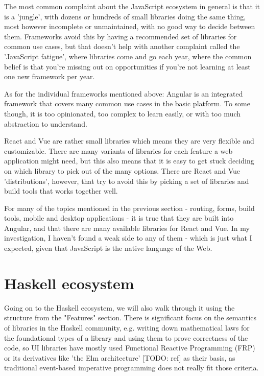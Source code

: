 \documentclass[english,odsaz]{fitthesis}
\begin{document}
The most common complaint about the JavaScript ecosystem in general is that it
is a 'jungle', with dozens or hundreds of small libraries doing the same thing,
most however incomplete or unmaintained, with no good way to decide between
them. Frameworks avoid this by having a recommended set of libraries for common
use cases, but that doesn't help with another complaint called the 'JavaScript
fatigue', where libraries come and go each year, where the common belief is that
you're missing out on opportunities if you're not learning at least one new
framework per year.

As for the individual frameworks mentioned above: Angular is an integrated
framework that covers many common use cases in the basic platform. To some
though, it is too opinionated, too complex to learn easily, or with too much
abstraction to understand.

React and Vue are rather small libraries which means they are very flexible and
customizable. There are many variants of libraries for each feature a web
application might need, but this also means that it is easy to get stuck
deciding on which library to pick out of the many options. There are React and
Vue 'distributions', however, that try to avoid this by picking a set of libraries and
build tools that works together well.

For many of the topics mentioned in the previous section - routing, forms, build
tools, mobile and desktop applications - it is true that they are built into
Angular, and that there are many available libraries for React and Vue.
In my investigation, I haven't found a weak side to any of them - which is just
what I expected, given that JavaScript is the native language of the Web.

\section{Haskell ecosystem}
\label{sec:org28806d4}
Going on to the Haskell ecosystem, we will also walk through it using the
structure from the "Features" section. There is significant focus on the
semantics of libraries in the Haskell community, e.g. writing down mathematical
laws for the foundational types of a library and using them to prove correctness
of the code, so UI libraries have mostly used Functional Reactive Programming
(FRP) or its derivatives like 'the Elm architecture' [TODO: ref] as their basis,
as traditional event-based imperative programming does not really fit those
criteria.
\end{document}
